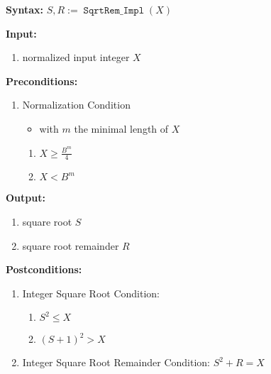 \documentclass[%
    a4paper,%
]{article}
\makeatletter
\DeclareMathOperator\SqrtRemImpl{\texttt{SqrtRem\_Impl}}
\newenvironment*{algo}{%
    \newcommand*\algo@noNextParskip{%
        \vspace{-\parskip}%
    }%
    \newcommand*\algo@section{\textbf}%
    \newcommand*\Syntax{%
        \algo@section{Syntax:} %
    }%
    \newcommand*\Input{%
        \algo@section{Input:}%
        \algo@noNextParskip%
    }%
    \newcommand*\PreConditions{%
        \algo@section{Preconditions:}%
        \algo@noNextParskip%
    }%
    \newcommand*\Output{%
        \algo@section{Output:}%
        \algo@noNextParskip%
    }%
    \newcommand*\PostConditions{%
        \algo@section{Postconditions:}%
        \algo@noNextParskip%
    }%
    \newcommand*\DeducedPostConditions{%
        \algo@section{Deduced Postconditions:}%
        \algo@noNextParskip%
    }%
    \newcommand*\Algorithm{%
        \algo@section{Algorithm:}%
        \algo@noNextParskip%
    }%
}{%
}
\makeatother
\begin{document}
\begin{algo}
\Syntax $S, R := \SqrtRemImpl(X)$

\Input
\begin{enumerate}
\item normalized input integer $X$
\end{enumerate}

\PreConditions
\begin{enumerate}
\item Normalization Condition
    \begin{itemize}
    \item with $m$ the minimal length of $X$
    \end{itemize}
    \begin{enumerate}
    \item $X \ge \frac{B^m}{4}$
    \item $X < B^m$
    \end{enumerate}
\end{enumerate}

\Output
\begin{enumerate}
\item square root $S$
\item square root remainder $R$
\end{enumerate}

\PostConditions
\begin{enumerate}
\item Integer Square Root Condition:
    \begin{enumerate}
    \item $S^2 \le X$
    \item $(S+1)^2 > X$
    \end{enumerate}
\item Integer Square Root Remainder Condition: $S^2 + R = X$
\end{enumerate}


\end{algo}
\end{document}
